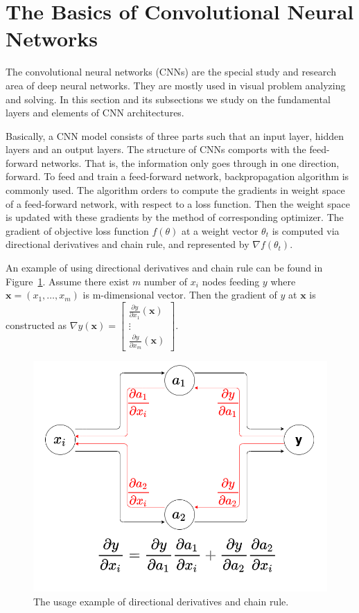 \section{The Basics of Convolutional Neural Networks} \label{basics_of_cnn}

The convolutional neural networks (CNNs) are the special study and research area of deep neural networks. They are mostly used in visual problem analyzing and solving. In this section and its subsections we study on the fundamental layers and elements of CNN architectures. 

Basically, a CNN model consists of three parts such that an input layer, hidden layers and an output layers. The structure of CNNs comports with the feed-forward networks. That is, the information only goes through in one direction, forward. To feed and train a feed-forward network, backpropagation algorithm is commonly used. The algorithm orders to compute the gradients in weight space of a feed-forward network, with respect to a loss function. Then the weight space is updated with these gradients by the method of corresponding optimizer. The gradient of objective loss function $ f(\textbf{$\theta$}) $ at a weight vector \textbf{$\theta_{t}$} is computed via directional derivatives and chain rule, and represented by $ \nabla f(\textbf{$\theta_{t}$}) $. 

An example of using directional derivatives and chain rule can be found in Figure~\ref{fig:compute_gradient}. Assume there exist $m$ number of $x_{i}$ nodes feeding $y$ where $\textbf{x} = (x_{1}, \dots , x_{m})$ is m-dimensional vector. Then the gradient of $y$ at $\textbf{x}$ is constructed as $\nabla y (\textbf{x}) = {\begin{bmatrix}{\frac {\partial y}{\partial x_{1}}}(\textbf{x})\\\vdots \\{\frac {\partial y}{\partial x_{m}}}(\textbf{x})\end{bmatrix}}$.

\begin{figure}[h]
	\centering
	\includegraphics[width=.6\linewidth]{fig/gradient_example.png}
	\vspace*{1mm}
	\caption{The usage example of directional derivatives and chain rule.}
	\label{fig:compute_gradient}
\end{figure}

